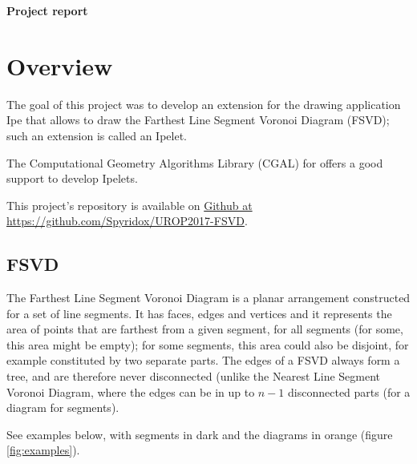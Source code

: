 \documentclass[11pt,a4paper,english]{article}
\begin{document}
    {\centering\huge\textbf{Project report}\par}

    \vspace{1cm}
    
    \section{Overview}
	
	The goal of this project was to develop an extension for the drawing application Ipe that allows to draw the Farthest Line Segment Voronoi Diagram (FSVD); such an extension is called an Ipelet.\par
	The Computational Geometry Algorithms Library (CGAL) for  offers a good support to develop Ipelets.\par
	This project's repository is available on \href{https://github.com/Spyridox/UROP2017-FSVD}{Github at https://github.com/Spyridox/UROP2017-FSVD}.
	
	\subsection{FSVD}
	
	The Farthest Line Segment Voronoi Diagram is a planar arrangement  constructed for a set of line segments. It has faces, edges and vertices and it represents the area of points that are farthest from a given segment, for all segments (for some, this area might be empty); for some segments, this area could also be disjoint, for example constituted by two separate parts. The edges of a FSVD always form a tree, and are therefore never disconnected (unlike the Nearest Line Segment Voronoi Diagram, where the edges can be in up to \(n -1\) disconnected parts (for a diagram for \n segments).\par
	See examples below, with segments in dark and the diagrams in orange (figure \ref{fig:examples}).
	
\end{document}
